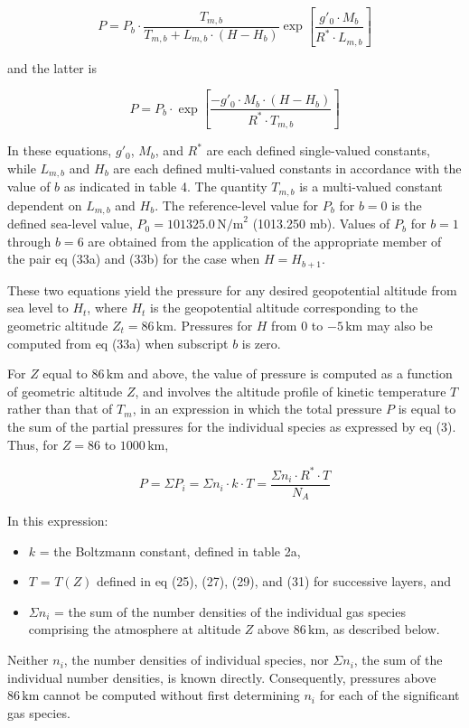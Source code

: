 \documentclass{article}
\begin{document}
\[
P = P_b \cdot \frac{T_{m,b}}{T_{m,b} + L_{m,b} \cdot (H - H_b)} \exp \left[ \frac{g'_0 \cdot M_b}{R^* \cdot L_{m,b}} \right] \tag{33a}
\]

and the latter is 

\[
P = P_b \cdot \exp \left[ \frac{-g'_0 \cdot M_b \cdot (H - H_b)}{R^* \cdot T_{m,b}} \right] \tag{33b}
\]

In these equations, $g'_0$, $M_b$, and $R^*$ are each defined single-valued constants, while $L_{m,b}$ and $H_b$ are each defined multi-valued constants in accordance with the value of $b$ as indicated in table 4. The quantity $T_{m,b}$ is a multi-valued constant dependent on $L_{m,b}$ and $H_b$. The reference-level value for $P_b$ for $b = 0$ is the defined sea-level value, $P_0 = 101325.0 \, \text{N/m}^2$ (1013.250 mb). Values of $P_b$ for $b = 1$ through $b = 6$ are obtained from the application of the appropriate member of the pair eq (33a) and (33b) for the case when $H = H_{b+1}$.

These two equations yield the pressure for any desired geopotential altitude from sea level to $H_t$, where $H_t$ is the geopotential altitude corresponding to the geometric altitude $Z_t = 86 \, \text{km}$. Pressures for $H$ from $0$ to $-5 \, \text{km}$ may also be computed from eq (33a) when subscript $b$ is zero.

For $Z$ equal to $86 \, \text{km}$ and above, the value of pressure is computed as a function of geometric altitude $Z$, and involves the altitude profile of kinetic temperature $T$ rather than that of $T_m$, in an expression in which the total pressure $P$ is equal to the sum of the partial pressures for the individual species as expressed by eq (3). Thus, for $Z = 86$ to $1000 \, \text{km}$,

\[
P = \Sigma P_i = \Sigma n_i \cdot k \cdot T = \frac{\Sigma n_i \cdot R^* \cdot T}{N_A} \tag{33c}
\]

In this expression:

\begin{itemize}
    \item $k$ = the Boltzmann constant, defined in table 2a,
    \item $T$ = $T(Z)$ defined in eq (25), (27), (29), and (31) for successive layers, and
    \item $\Sigma n_i$ = the sum of the number densities of the individual gas species comprising the atmosphere at altitude $Z$ above $86 \, \text{km}$, as described below.
\end{itemize}

Neither $n_i$, the number densities of individual species, nor $\Sigma n_i$, the sum of the individual number densities, is known directly. Consequently, pressures above $86 \, \text{km}$ cannot be computed without first determining $n_i$ for each of the significant gas species.
\end{document}

